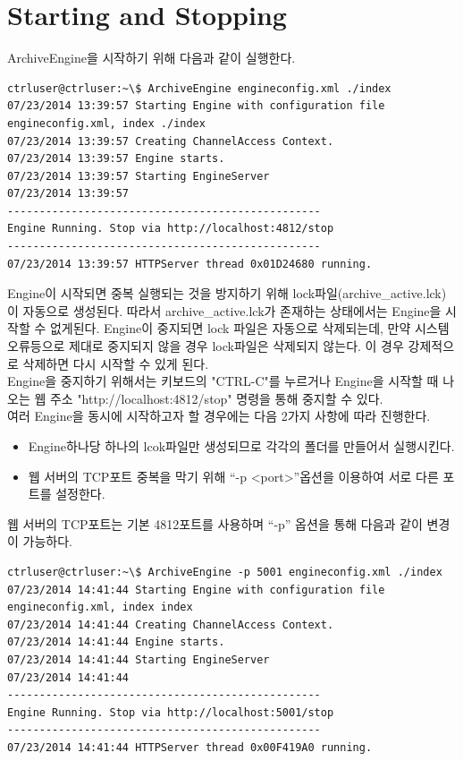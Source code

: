\documentclass[11pt
  , a4paper
  , article
  , oneside
]{memoir}
\begin{document}
\section{Starting and Stopping}
ArchiveEngine을 시작하기 위해 다음과 같이 실행한다.
\begin{lstlisting}[style=termstyle]
ctrluser@ctrluser:~\$ ArchiveEngine engineconfig.xml ./index
07/23/2014 13:39:57 Starting Engine with configuration file engineconfig.xml, index ./index
07/23/2014 13:39:57 Creating ChannelAccess Context.
07/23/2014 13:39:57 Engine starts.
07/23/2014 13:39:57 Starting EngineServer
07/23/2014 13:39:57 
-------------------------------------------------
Engine Running. Stop via http://localhost:4812/stop
-------------------------------------------------
07/23/2014 13:39:57 HTTPServer thread 0x01D24680 running.
\end{lstlisting}
Engine이 시작되면 중복 실행되는 것을 방지하기 위해 lock파일(archive\_active.lck)이 자동으로 생성된다.
따라서 archive\_active.lck가 존재하는 상태에서는 Engine을 시작할 수 없게된다. Engine이 중지되면 lock
파일은 자동으로 삭제되는데, 만약 시스템 오류등으로 제대로 중지되지 않을 경우 lock파일은 삭제되지 않는다.
이 경우 강제적으로 삭제하면 다시 시작할 수 있게 된다.\\
Engine을 중지하기 위해서는 키보드의 "CTRL-C"를 누르거나 Engine을 시작할 때 나오는 웹 주소
"http://localhost:4812/stop" 명령을 통해 중지할 수 있다.\\
여러 Engine을 동시에 시작하고자 할 경우에는 다음 2가지 사항에 따라 진행한다.
\begin{itemize}
\item Engine하나당 하나의 lcok파일만 생성되므로 각각의 폴더를 만들어서 실행시킨다.
\item 웹 서버의 TCP포트 중복을 막기 위해 ``-p \textless port\textgreater''옵션을 이용하여 서로 다른 포트를 설정한다.
\end{itemize}
웹 서버의 TCP포트는 기본 4812포트를 사용하며 ``-p'' 옵션을 통해 다음과 같이 변경이 가능하다.
\begin{lstlisting}[style=termstyle]
ctrluser@ctrluser:~\$ ArchiveEngine -p 5001 engineconfig.xml ./index
07/23/2014 14:41:44 Starting Engine with configuration file engineconfig.xml, index index
07/23/2014 14:41:44 Creating ChannelAccess Context.
07/23/2014 14:41:44 Engine starts.
07/23/2014 14:41:44 Starting EngineServer
07/23/2014 14:41:44 
-------------------------------------------------
Engine Running. Stop via http://localhost:5001/stop
-------------------------------------------------
07/23/2014 14:41:44 HTTPServer thread 0x00F419A0 running.
\end{lstlisting} 
\end{document}
